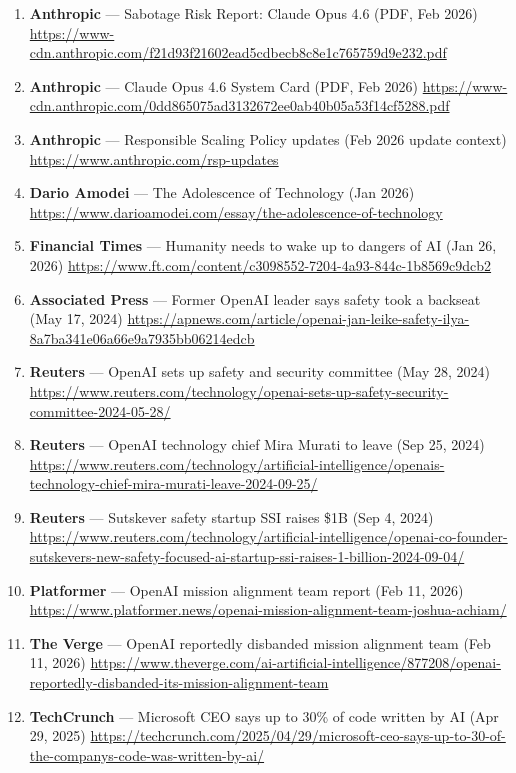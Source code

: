 \documentclass[
]{article}
\begin{document}
\begin{enumerate}
\item
  \textbf{Anthropic} --- Sabotage Risk Report: Claude Opus 4.6 (PDF, Feb
  2026)
  \url{https://www-cdn.anthropic.com/f21d93f21602ead5cdbecb8c8e1c765759d9e232.pdf}
\item
  \textbf{Anthropic} --- Claude Opus 4.6 System Card (PDF, Feb 2026)
  \url{https://www-cdn.anthropic.com/0dd865075ad3132672ee0ab40b05a53f14cf5288.pdf}
\item
  \textbf{Anthropic} --- Responsible Scaling Policy updates (Feb 2026
  update context) \url{https://www.anthropic.com/rsp-updates}
\item
  \textbf{Dario Amodei} --- The Adolescence of Technology (Jan 2026)
  \url{https://www.darioamodei.com/essay/the-adolescence-of-technology}
\item
  \textbf{Financial Times} --- Humanity needs to wake up to dangers of
  AI (Jan 26, 2026)
  \url{https://www.ft.com/content/c3098552-7204-4a93-844c-1b8569c9dcb2}
\item
  \textbf{Associated Press} --- Former OpenAI leader says safety took a
  backseat (May 17, 2024)
  \url{https://apnews.com/article/openai-jan-leike-safety-ilya-8a7ba341e06a66e9a7935bb06214edcb}
\item
  \textbf{Reuters} --- OpenAI sets up safety and security committee (May
  28, 2024)
  \url{https://www.reuters.com/technology/openai-sets-up-safety-security-committee-2024-05-28/}
\item
  \textbf{Reuters} --- OpenAI technology chief Mira Murati to leave (Sep
  25, 2024)
  \url{https://www.reuters.com/technology/artificial-intelligence/openais-technology-chief-mira-murati-leave-2024-09-25/}
\item
  \textbf{Reuters} --- Sutskever safety startup SSI raises \$1B (Sep 4,
  2024)
  \url{https://www.reuters.com/technology/artificial-intelligence/openai-co-founder-sutskevers-new-safety-focused-ai-startup-ssi-raises-1-billion-2024-09-04/}
\item
  \textbf{Platformer} --- OpenAI mission alignment team report (Feb 11,
  2026)
  \url{https://www.platformer.news/openai-mission-alignment-team-joshua-achiam/}
\item
  \textbf{The Verge} --- OpenAI reportedly disbanded mission alignment
  team (Feb 11, 2026)
  \url{https://www.theverge.com/ai-artificial-intelligence/877208/openai-reportedly-disbanded-its-mission-alignment-team}
\item
  \textbf{TechCrunch} --- Microsoft CEO says up to 30\% of code written
  by AI (Apr 29, 2025)
  \url{https://techcrunch.com/2025/04/29/microsoft-ceo-says-up-to-30-of-the-companys-code-was-written-by-ai/}

\end{enumerate}
\end{document}
